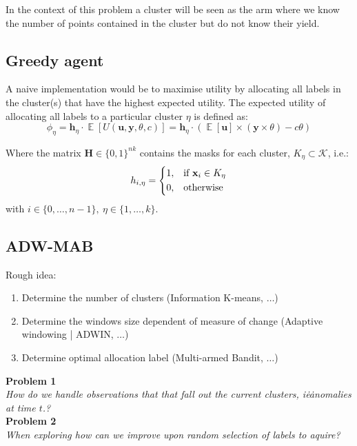 In the context of this problem a cluster will be seen as the arm where we know the number of points contained in the cluster but do not know their yield.
\subsection*{Greedy agent}
A naive implementation would be to maximise utility by allocating all labels in the cluster(s) that have the highest expected utility.
The expected utility of allocating all labels to a particular cluster $\eta$ is defined as:
\begin{equation}
\phi_{\eta} = \textbf{h}_{\eta} \cdot \mathop{\mathbb{E}}[U(\textbf{u}, \mathbf{y}, \theta, c)] = \textbf{h}_{\eta} \cdot (\mathop{\mathbb{E}}[\textbf{u}] \times (\textbf{y} \times \theta) - c\theta)
\end{equation}

Where the matrix $\textbf{H} \in {\{0,1\}}^{nk}$ contains the masks for each cluster, $K_\eta \subset \mathcal{K}$, i.e.:
\begin{equation}
h_{i,\eta}=
\begin{dcases}
1,& \text{if } \textbf{x}_{i} \in K_\eta\\
0, & \text{otherwise}
\end{dcases}
\end{equation}
with $i \in \{0,\ldots,n-1\},~\eta \in \{1, \ldots, k\}$.\\

\subsection*{ADW-MAB}
Rough idea:
\begin{enumerate}
  \item Determine the number of clusters (Information K-means, $\ldots$)
  \item Determine the windows size dependent of measure of change (Adaptive windowing | ADWIN, $\ldots$)
  \item Determine optimal allocation label (Multi-armed Bandit, $\ldots$)
\end{enumerate}

\textbf{Problem 1}\\
\textit{How do we handle observations that that fall out the current clusters, i\.e\. anomalies at time $t$.?}\\[3mm]

\textbf{Problem 2}\\
\textit{When exploring how can we improve upon random selection of labels to aquire?}\\

